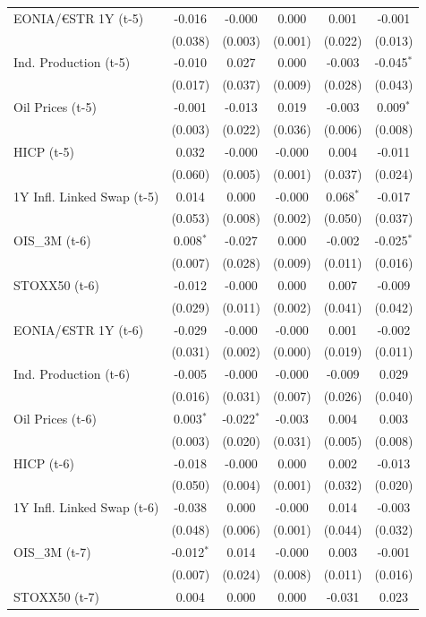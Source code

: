 \begin{longtable}[t]{lccccc}
EONIA/€STR 1Y (t-5) & -0.016 & -0.000 & 0.000 & 0.001 & -0.001\\
 & (0.038) & (0.003) & (0.001) & (0.022) & (0.013)\\
Ind. Production (t-5) & -0.010 & 0.027 & 0.000 & -0.003 & -0.045$^{*}$\\
 & (0.017) & (0.037) & (0.009) & (0.028) & (0.043)\\
Oil Prices (t-5) & -0.001 & -0.013 & 0.019 & -0.003 & 0.009$^{*}$\\
 & (0.003) & (0.022) & (0.036) & (0.006) & (0.008)\\
HICP (t-5) & 0.032 & -0.000 & -0.000 & 0.004 & -0.011\\
 & (0.060) & (0.005) & (0.001) & (0.037) & (0.024)\\
1Y Infl. Linked Swap (t-5) & 0.014 & 0.000 & -0.000 & 0.068$^{*}$ & -0.017\\
 & (0.053) & (0.008) & (0.002) & (0.050) & (0.037)\\
OIS\_3M (t-6) & 0.008$^{*}$ & -0.027 & 0.000 & -0.002 & -0.025$^{*}$\\
 & (0.007) & (0.028) & (0.009) & (0.011) & (0.016)\\
STOXX50 (t-6) & -0.012 & -0.000 & 0.000 & 0.007 & -0.009\\
 & (0.029) & (0.011) & (0.002) & (0.041) & (0.042)\\
EONIA/€STR 1Y (t-6) & -0.029 & -0.000 & -0.000 & 0.001 & -0.002\\
 & (0.031) & (0.002) & (0.000) & (0.019) & (0.011)\\
Ind. Production (t-6) & -0.005 & -0.000 & -0.000 & -0.009 & 0.029\\
 & (0.016) & (0.031) & (0.007) & (0.026) & (0.040)\\
Oil Prices (t-6) & 0.003$^{*}$ & -0.022$^{*}$ & -0.003 & 0.004 & 0.003\\
 & (0.003) & (0.020) & (0.031) & (0.005) & (0.008)\\
HICP (t-6) & -0.018 & -0.000 & 0.000 & 0.002 & -0.013\\
 & (0.050) & (0.004) & (0.001) & (0.032) & (0.020)\\
1Y Infl. Linked Swap (t-6) & -0.038 & 0.000 & -0.000 & 0.014 & -0.003\\
 & (0.048) & (0.006) & (0.001) & (0.044) & (0.032)\\
OIS\_3M (t-7) & -0.012$^{*}$ & 0.014 & -0.000 & 0.003 & -0.001\\
 & (0.007) & (0.024) & (0.008) & (0.011) & (0.016)\\
STOXX50 (t-7) & 0.004 & 0.000 & 0.000 & -0.031 & 0.023\\

\end{longtable}
